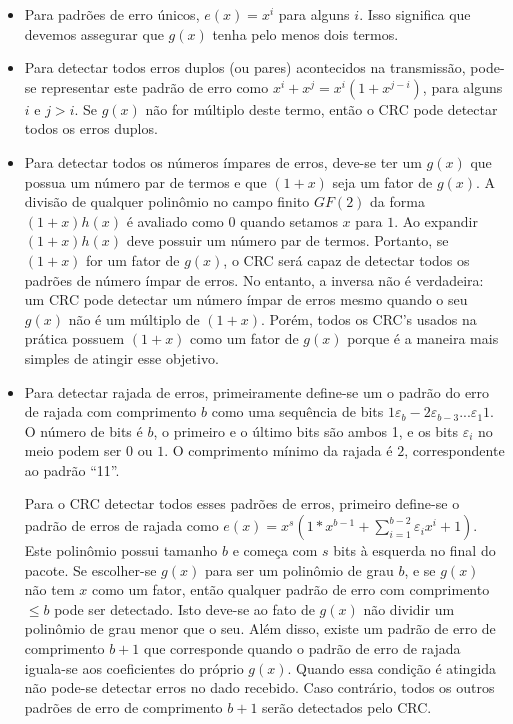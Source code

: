 \begin{itemize}
	\item Para padrões de erro únicos, $e(x) = x^{i}$ para alguns $i$. Isso significa que devemos assegurar que $g(x)$ tenha pelo menos dois termos.
	\item Para detectar todos erros duplos (ou pares) acontecidos na transmissão, pode-se representar este padrão de erro como $x^{i} + x^{j} = x^{i}(1 + x^{j − i})$, para alguns $i$ e $j > i$. Se $g(x)$ não for múltiplo deste termo, então o CRC pode detectar todos os erros duplos.
	\item Para detectar todos os números ímpares de erros, deve-se ter um $g(x)$ que possua um número par de termos e que $(1 + x)$ seja um fator de $g(x)$. A divisão de qualquer polinômio no campo finito $GF(2)$ da forma $(1 + x)h(x)$ é avaliado como $0$ quando setamos $x$ para $1$. Ao expandir $(1 + x)h(x)$ deve possuir um número par de termos. Portanto, se $(1 + x)$ for um fator de $g(x)$, o CRC será capaz de detectar todos os padrões de número ímpar de erros. No entanto, a inversa não é verdadeira: um CRC pode detectar um número ímpar de erros mesmo quando o seu $g(x)$ não é um múltiplo de $(1 + x)$. Porém, todos os CRC's usados na prática	possuem $(1 + x)$ como um fator de $g(x)$ porque é a maneira mais simples de atingir esse objetivo.
	\item Para detectar rajada de erros, primeiramente define-se um o padrão do erro de rajada com comprimento $b$ como uma sequência de bits $1\varepsilon_{b} − 2\varepsilon_{b − 3} ... \varepsilon_{1}1$.  O número de bits é $b$, o primeiro e o último bits são ambos 1, e os bits $\varepsilon_{i}$ no meio podem ser $0$ ou $1$. O comprimento mínimo da rajada é $2$, correspondente ao padrão “11”. 

	Para o CRC detectar todos esses padrões de erros, primeiro define-se o padrão de erros de rajada como $e(x)=	x^{s} (1 * x^{b-1} + \sum_{i = 1}^{b − 2} \varepsilon_{i}x^{i} + 1)$. Este polinômio possui tamanho $b$ e começa com $s$ bits à esquerda no final do pacote. Se escolher-se $g(x)$ para ser um polinômio de grau $b$, e se $g(x)$ não tem $x$ como um fator, então qualquer padrão de erro com comprimento $\leq b$ pode ser detectado. Isto deve-se ao fato de $g(x)$ não dividir um polinômio de grau menor que o seu. Além disso, existe um padrão de erro de comprimento $b + 1$ que corresponde quando o padrão de erro de rajada iguala-se aos coeficientes do próprio $g(x)$. Quando essa condição é atingida não pode-se detectar erros no dado recebido. Caso contrário, todos os outros padrões de erro de comprimento $b + 1$ serão detectados pelo CRC.
\end{itemize}


